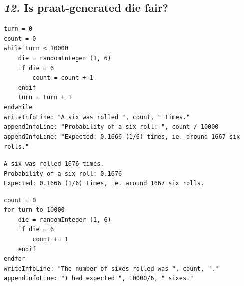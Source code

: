 \documentclass[12pt, english]{article}
\begin{document}
\subsection*{\emph{12.} Is praat-generated die fair?}

\begin{lstlisting}
turn = 0
count = 0
while turn < 10000
	die = randomInteger (1, 6)
	if die = 6
		count = count + 1
	endif
	turn = turn + 1
endwhile
writeInfoLine: "A six was rolled ", count, " times."
appendInfoLine: "Probability of a six roll: ", count / 10000
appendInfoLine: "Expected: 0.1666 (1/6) times, ie. around 1667 six rolls."
\end{lstlisting}

\begin{lstlisting}[title=\textbf{Info Window}]
A six was rolled 1676 times.
Probability of a six roll: 0.1676
Expected: 0.1666 (1/6) times, ie. around 1667 six rolls.
\end{lstlisting}

\begin{lstlisting}[rulesepcolor=\color{blue}]
count = 0
for turn to 10000
    die = randomInteger (1, 6)
    if die = 6
        count += 1
    endif
endfor
writeInfoLine: "The number of sixes rolled was ", count, "."
appendInfoLine: "I had expected ", 10000/6, " sixes."
\end{lstlisting}
\end{document}
